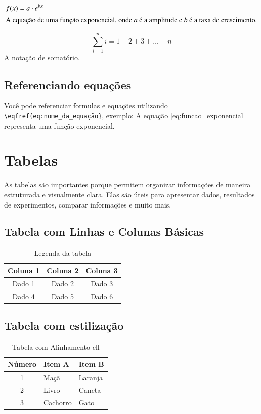 \documentclass[11pt,letterpaper]{article}
\begin{document}
\begin{align}
    f(x) &= a \cdot e^{bx} \label{eq:funcao_exponencial} \\
    \intertext{A equação de uma função exponencial, onde $a$ é a amplitude e $b$ é a taxa de crescimento.}
\end{align}

\begin{equation}
    \label{eq:somatorio}
    \sum_{i=1}^{n} i = 1 + 2 + 3 + \dots + n
\end{equation}
A notação de somatório.

\subsection*{Referenciando equações}
Você pode referenciar formulas e equações utilizando \verb|\eqfref{eq:nome_da_equação}|, exemplo: A equação \eqref{eq:funcao_exponencial} representa uma função exponencial.

\section{Tabelas}
As tabelas são importantes porque permitem organizar informações de maneira estruturada e visualmente clara. Elas são úteis para apresentar dados, resultados de experimentos, comparar informações e muito mais. 
\subsection{Tabela com Linhas e Colunas Básicas}
\begin{table}[h]
    \centering
    \begin{tabular}{|c|c|c|}
        \hline
        Coluna 1 & Coluna 2 & Coluna 3 \\
        \hline
        Dado 1 & Dado 2 & Dado 3 \\
        \hline
        Dado 4 & Dado 5 & Dado 6 \\
        \hline
    \end{tabular}
    \caption{Legenda da tabela}
    \label{tab:referencia_da_tabela1}
\end{table}

\subsection{Tabela com estilização}
\begin{table}[h]
    \centering
    \label{tab:exemplo_rll}
    \begin{tabular}{cll}
        \hline
        \textbf{Número} & \textbf{Item A} & \textbf{Item B} \\
        \hline
        1 & Maçã & Laranja \\
        2 & Livro & Caneta \\
        3 & Cachorro & Gato \\
        \hline
    \end{tabular}
    \caption{Tabela com Alinhamento cll} %
    
    \label{tab:referencia_da_tabela}
\end{table}
\end{document}
